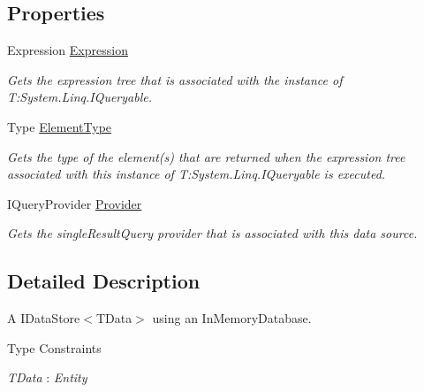 \subsection*{Properties}
\begin{DoxyCompactItemize}
\item 
Expression \hyperlink{classCqrs_1_1DataStores_1_1InProcessDataStore_a459174c411a0df2b4ec1e48a3b36f884}{Expression}
\begin{DoxyCompactList}\small\item\em Gets the expression tree that is associated with the instance of T\+:\+System.\+Linq.\+I\+Queryable. \end{DoxyCompactList}\item 
Type \hyperlink{classCqrs_1_1DataStores_1_1InProcessDataStore_aacc8434efa0250be78dda57e159a5aa8}{Element\+Type}
\begin{DoxyCompactList}\small\item\em Gets the type of the element(s) that are returned when the expression tree associated with this instance of T\+:\+System.\+Linq.\+I\+Queryable is executed. \end{DoxyCompactList}\item 
I\+Query\+Provider \hyperlink{classCqrs_1_1DataStores_1_1InProcessDataStore_a9f4e487d52f69245266afdf303d585c1}{Provider}
\begin{DoxyCompactList}\small\item\em Gets the single\+Result\+Query provider that is associated with this data source. \end{DoxyCompactList}\end{DoxyCompactItemize}


\subsection{Detailed Description}
A I\+Data\+Store$<$\+T\+Data$>$ using an In\+Memory\+Database. 

\begin{Desc}
\item[Type Constraints]\begin{description}
\item[{\em T\+Data} : {\em Entity}]\end{description}
\end{Desc}


